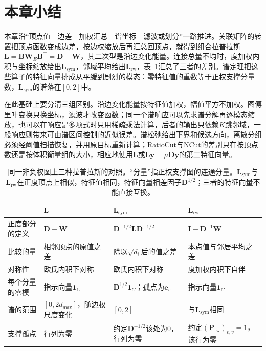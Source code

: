 
\section{本章小结}
\label{sec:graph-spectral-summary}

本章沿“顶点值—边差—加权汇总—谱坐标—滤波或划分”一路推进。关联矩阵的转置把顶点函数变成边差，按边权缩放后再汇总回顶点，就得到组合拉普拉斯$\bm L=\bm B\bm W_E\bm B^{\top}=\bm D-\bm W$，其二次型是沿边变化能量。连接总量不均时，度加权内积与坐标缩放给出$\bm L_{\mathrm{sym}}$，邻域平均给出$\bm L_{\mathrm{rw}}$，表~\ref{tab:graph-spec-laplacian-comparison}汇总了三者的差别。谱定理把这些算子的特征向量排成从平缓到剧烈的模态：零特征值的重数等于正权支撑分量数，$\bm L_{\mathrm{sym}}$的谱落在$[0,2]$中。

在此基础上要分清三组区别。沿边变化能量按特征值加权，幅值平方不加权。图傅里叶变换只换坐标，滤波才改变函数；同一个谱响应可以先求谱分解再逐模态缩放，也可以在响应是多项式时只用稀疏乘法计算，后者的输出只依赖$K$跳邻域，一般响应则带来可由谱区间控制的近似误差。谱松弛给出下界和候选方向，离散分组必须经阈值扫描恢复，并用原目标重新计算；RatioCut与NCut的差别只在按顶点数还是按体积衡量组的大小，相应地使用$\bm L$或$\bm L\bm y=\mu\bm D\bm y$的第二特征向量。

\begin{table}[!htb]
  \centering\small
  \begin{tabularx}{\linewidth}{@{}lXXX@{}}
    \toprule
    & $\bm L$ & $\bm L_{\mathrm{sym}}$ & $\bm L_{\mathrm{rw}}$\\
    \midrule
    正度部分的定义 & $\bm D-\bm W$ & $\bm D^{-1/2}\bm L\bm D^{-1/2}$ & $\bm I-\bm D^{-1}\bm W$\\
    比较的量 & 相邻顶点的原值之差 & 除以$\sqrt{d_i}$后的值之差 & 本点值与邻居平均之差\\
    对称性 & 欧氏内积下对称 & 欧氏内积下对称 & 度加权内积下自伴\\
    每个分量的零模 & 指示向量$\bm1_C$ & $\bm D^{1/2}\bm1_C$；孤点为$\bm e_v$ & 指示向量$\bm1_C$\\
    谱的范围 & $[0,2d_{\max}]$，随边权尺度变化 & $[0,2]$ & 与$\bm L_{\mathrm{sym}}$相同\\
    支撑孤点 & 行列为零 & 约定$\bm D^{-1/2}$该处为$0$，行列为零 & 约定$(\bm P_{\mathrm{rw}})_{v,v}=1$，该行为零\\
    \bottomrule
  \end{tabularx}
  \caption{同一非负权图上三种拉普拉斯的对照。“分量”指正权支撑图的连通分量。$\bm L_{\mathrm{sym}}$与$\bm L_{\mathrm{rw}}$在正度顶点上相似，特征值相同，特征向量相差因子$\bm D^{1/2}$；三者的特征向量不能直接互换。}
  \label{tab:graph-spec-laplacian-comparison}
\end{table}

